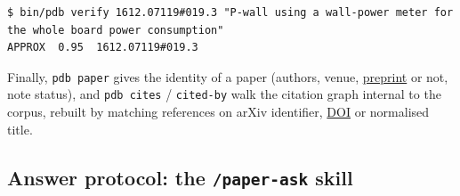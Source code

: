 \documentclass[11pt,a4paper]{article}
\newcommand{\cmd}[1]{\texttt{#1}}
\newcommand{\gl}[2]{\hyperlink{gl:#1}{\textcolor{glcolor}{#2}}}
\begin{document}
\begin{lstlisting}
$ bin/pdb verify 1612.07119#019.3 "P-wall using a wall-power meter for the whole board power consumption"
APPROX  0.95  1612.07119#019.3
\end{lstlisting}

Finally, \cmd{pdb paper} gives the identity of a paper (authors, venue, \gl{preprint}{preprint} or not,
note status), and \cmd{pdb cites} / \cmd{cited-by} walk the citation graph internal to the
corpus, rebuilt by matching references on arXiv identifier, \gl{DOI}{DOI} or normalised title.

\subsection{Answer protocol: the \cmd{/paper-ask} skill}
\label{sec:paperask}
\end{document}
